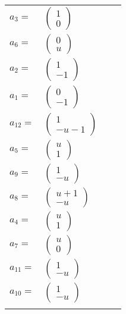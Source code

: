 \documentclass[1p]{elsarticle_modified}
\theoremstyle{definition}
\begin{document}
\begin{tabular}{m{7pt} m{180pt} m{7pt} m{180pt} }
\flushright $a_{3}=$&$\begin{pmatrix}1\\0\end{pmatrix}$ \\
\flushright $a_{6}=$&$\begin{pmatrix}0\\u\end{pmatrix}$ \\
\flushright $a_{2}=$&$\begin{pmatrix}1\\-1\end{pmatrix}$ \\
\flushright $a_{1}=$&$\begin{pmatrix}0\\-1\end{pmatrix}$ \\
\flushright $a_{12}=$&$\begin{pmatrix}1\\- u-1\end{pmatrix}$ \\
\flushright $a_{5}=$&$\begin{pmatrix}u\\1\end{pmatrix}$ \\
\flushright $a_{9}=$&$\begin{pmatrix}1\\- u\end{pmatrix}$ \\
\flushright $a_{8}=$&$\begin{pmatrix}u+1\\- u\end{pmatrix}$ \\
\flushright $a_{4}=$&$\begin{pmatrix}u\\1\end{pmatrix}$ \\
\flushright $a_{7}=$&$\begin{pmatrix}u\\0\end{pmatrix}$ \\
\flushright $a_{11}=$&$\begin{pmatrix}1\\- u\end{pmatrix}$ \\
\flushright $a_{10}=$&$\begin{pmatrix}1\\- u\end{pmatrix}$\\&\end{tabular}
\end{document}
